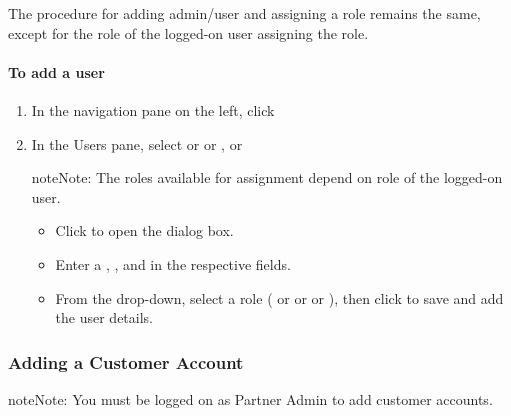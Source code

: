 \documentclass[letterpaper,10pt,english]{sphinxmanual}
\begin{document}
The procedure for adding admin/user and assigning a role remains the same, except for the role of the logged-on user assigning the role.


\paragraph{To add a user}
\label{\detokenize{loom_getting_started_guide:to-add-a-user}}\begin{enumerate}
\item {} 
In the navigation pane on the left, click 

\item {} 
In the Users pane, select  or  or , or 

\begin{sphinxadmonition}{note}{Note:}
The roles available for assignment depend on role of the logged-on user.
\end{sphinxadmonition}
\begin{itemize}
\item {} 
Click  to open the  dialog box.

\item {} 
Enter a , , and  in the respective fields.

\item {} 
From the  drop-down, select a role ( or  or  or ), then click  to save and add the user details.

\end{itemize}

\end{enumerate}


\subsubsection{Adding a Customer Account}
\label{\detokenize{loom_getting_started_guide:adding-a-customer-account}}
\begin{sphinxadmonition}{note}{Note:}
You must be logged on as Partner Admin to add customer accounts.
\end{sphinxadmonition}
\end{document}

